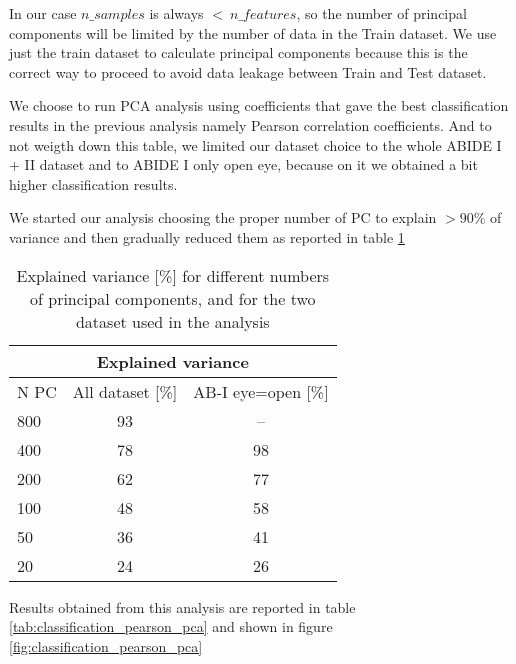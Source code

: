 \documentclass[10pt]{report}
\begin{document}
In our case $n\_samples$ is always $< \ n\_features$, so the number of principal components will be limited by the number of data in the Train dataset.
We use just the train dataset to calculate principal components because this is the correct way to proceed to avoid data leakage between Train and Test dataset.

We choose to run PCA analysis using coefficients that gave the best classification results in the previous analysis namely Pearson correlation coefficients. And to not weigth down this table, we limited our dataset choice to the whole ABIDE I + II dataset and to ABIDE I only open eye, because on it we obtained a bit higher classification results.

We started our analysis choosing the proper number of PC to explain $> 90\%$ of variance and then gradually reduced them as reported in table \ref{tab:pca_explained}

\begin{table}
\centering
\begin{tabular}{ |l|c c| }
\hline
\multicolumn{3}{|c|}{Explained variance} \\
 \hline
  N PC & All dataset [\%] & AB-I eye=open [\%] \\
  \hline
 800 & 93 & -- \\
 400 & 78 & 98 \\
 200 & 62 & 77 \\
 100 &48 & 58 \\
 50 & 36 & 41 \\
 20 & 24 & 26\\
 \hline
\end{tabular}
\caption{Explained variance [\%] for different numbers of principal components, and for the two dataset used in the analysis}
\label{tab:pca_explained}
\end{table}



Results obtained from this analysis are reported in table \ref{tab:classification_pearson_pca} and shown in figure \ref{fig:classification_pearson_pca}
\end{document}
